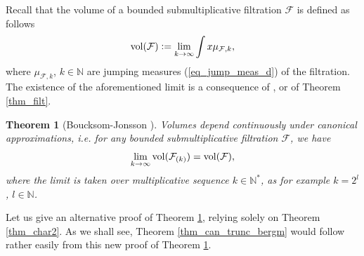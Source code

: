 \documentclass[12pt]{article}
\numberwithin{equation}{section}
\theoremstyle{theorem}
\newtheorem{thm}{Theorem}[section]
\theoremstyle{definition}
\theoremstyle{remark}
\newcommand{\nat}{\mathbb{N}}
\begin{document}
	Recall that the volume of a bounded submultiplicative filtration $\mathcal{F}$ is defined as follows
	\begin{equation}\label{eq_vol_filtr_defn}
		{\rm{vol}}(\mathcal{F}) := \lim_{k \to \infty} \int x \mu_{\mathcal{F}, k},
	\end{equation}
	where $\mu_{\mathcal{F}, k}$, $k \in \nat$ are jumping measures (\ref{eq_jump_meas_d}) of the filtration.
	The existence of the aforementioned limit is a consequence of \cite{ChenHNolyg}, \cite{BouckChen} or of Theorem \ref{thm_filt}.
	\begin{thm}[{Boucksom-Jonsson \cite[Theorem 3.18 and (3.14)]{BouckJohn21}}]\label{thm_vol_cont_dep}
		Volumes depend continuously under canonical approximations, i.e. for any bounded submultiplicative filtration $\mathcal{F}$, we have
		\begin{equation}\label{eq_vol_filtr_defn101}
			\lim_{k \to \infty} {\rm{vol}}(\mathcal{F}_{(k)}) = {\rm{vol}}(\mathcal{F}),
		\end{equation}
		where the limit is taken over multiplicative sequence $k \in \nat^*$, as for example $k = 2^l$, $l \in \nat$.
	\end{thm}
	Let us give an alternative proof of Theorem \ref{thm_vol_cont_dep}, relying solely on Theorem \ref{thm_char2}.
	As we shall see, Theorem \ref{thm_can_trunc_bergm} would follow rather easily from this new proof of Theorem \ref{thm_vol_cont_dep}.
\end{document}

